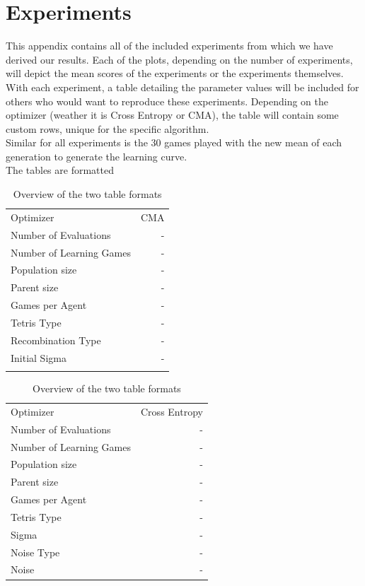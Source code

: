 \section{Experiments}
This appendix contains all of the included experiments from which we have derived our results. Each of the plots, depending on the number of experiments, will depict the mean scores of the experiments or the experiments themselves.\\
With each experiment, a table detailing the parameter values will be included for others who would want to reproduce these experiments. Depending on the optimizer (weather it is Cross Entropy or CMA), the table will contain some custom rows, unique for the specific algorithm.\\
Similar for all experiments is the 30 games played with the new mean of each generation to generate the learning curve.\\
The tables are formatted 
\begin{table}[h]
\centering
\begin{tabular}{l r}
Optimizer & CMA\\
Number of Evaluations & -\\
Number of Learning Games & -\\
Population size& -\\
Parent size & -\\
Games per Agent & -\\
Tetris Type & -\\
\hline
Recombination Type & -\\
Initial Sigma & -\\
 & \\
\end{tabular}
\quad
\begin{tabular}{l r}
Optimizer & Cross Entropy\\
Number of Evaluations & -\\
Number of Learning Games & -\\
Population size & -\\
Parent size & -\\
Games per Agent & -\\
Tetris Type & -\\
\hline
Sigma & -\\
Noise Type & -\\
Noise & -
\end{tabular}
\caption{Overview of the two table formats}
\end{table}

\clearpage

